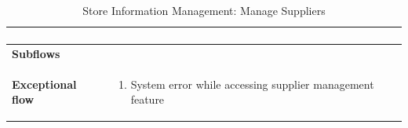 \documentclass[../thesis.tex]{subfiles}
\begin{document}
\begin{center}
\begin{table}[H]
{\begin{tabular}[htbp]{|p{}|p{}|}
\begin{enumerate}
                                                   \end{enumerate} \\ \hline
                \textbf{Subflows              }  &                                                                                   \\ \hline
                \textbf{Exceptional flow       } & \begin{enumerate}
                                                       \item System error while accessing supplier management feature
                                                   \end{enumerate}      \\ \hline
            \end{tabular}%
        }
        \caption{Store Information Management: Manage Suppliers}
        \label{tab:table-usecase-manage-suppliers}
    \end{table}
\end{center}
\end{document}
